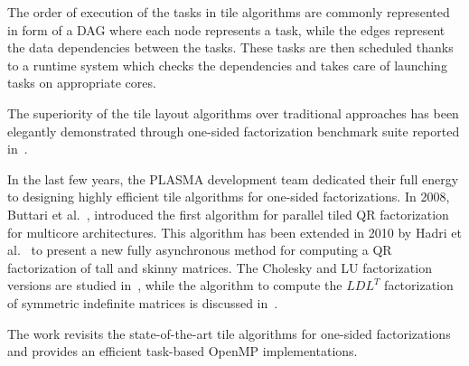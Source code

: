 The order of execution of the tasks in tile algorithms are commonly
represented in form of a DAG where each node represents a task, while
the edges represent the data dependencies between the tasks.  These
tasks are then scheduled thanks to a runtime system which checks the
dependencies and takes care of launching tasks on appropriate cores.

The superiority of the tile layout algorithms over traditional
approaches has been elegantly demonstrated through one-sided
factorization benchmark suite reported in~\cite{agullo2009comparative}.

In the last few years,
the PLASMA development team dedicated their full
energy to designing highly efficient tile
algorithms for one-sided factorizations.
In 2008, Buttari et al.~\cite{buttari2008parallel},
introduced the first algorithm for parallel tiled QR factorization for
multicore architectures.
This algorithm has been extended in 2010 by
Hadri et al.~\cite{hadri2010tile} to present a new fully asynchronous
method for computing a QR factorization of tall and skinny matrices.
The Cholesky and LU factorization versions are studied
in~\cite{DBLP:journals/corr/abs-0709-1272}, while the algorithm to
compute the $LDL^T$ factorization of symmetric indefinite matrices is
discussed in~\cite{becker2011towards}.

The work revisits the state-of-the-art tile algorithms for
one-sided factorizations and provides an
efficient task-based OpenMP implementations.
